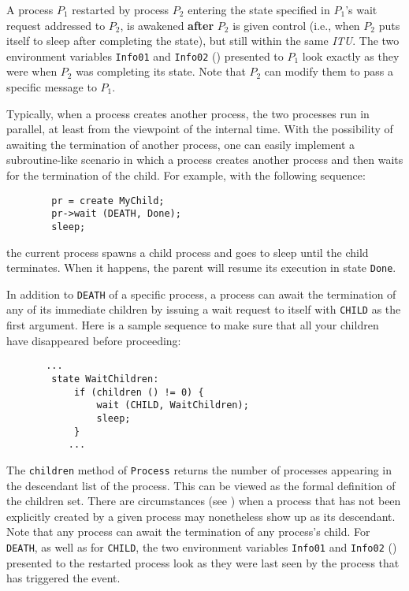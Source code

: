 A process $P_1$ restarted by process $P_2$ entering the state specified in
$P_1$'s wait request addressed to $P_2$, is awakened {\bf after} $P_2$ is
given control (i.e., when $P_2$ puts itself to sleep after completing the
state), but still within the same {\em ITU}.
The two environment variables {\tt Info01} and {\tt Info02} ()
presented to
$P_1$ look exactly as they were when $P_2$ was completing its state.
Note that $P_2$ can modify them to pass a specific message to $P_1$.

Typically, when a process creates another process, the two processes run
in parallel, at least from the viewpoint of the internal time.
With the possibility of awaiting the termination of another process, one
can easily implement a subroutine-like
scenario in which a process creates another process
and then waits for the termination of the child.
For example, with the following sequence:
\begin{verbatim}
        pr = create MyChild;
        pr->wait (DEATH, Done);
        sleep;
\end{verbatim}
the current process spawns a child process and goes to sleep until the
child terminates.
When it happens,
the parent will resume its execution in state {\tt Done}.

In addition to {\tt DEATH} of a specific process, a process can await the
termination of any of its immediate children by issuing a wait request to
itself with {\tt CHILD} as the first argument.
Here is a sample sequence to make sure that all your children have disappeared
before proceeding:
\begin{verbatim}
       ...
        state WaitChildren:
            if (children () != 0) {
                wait (CHILD, WaitChildren);
                sleep;
            }
           ...
\end{verbatim}
The {\tt children} method of {\tt Process} returns the number of
processes appearing in the descendant list of the process.
This can be viewed as the formal definition of the children set.
There are circumstances (see ) when a process
that has not been explicitly created by a given process may nonetheless
show up as its descendant.
Note that any process can await the termination of any process's child.
For {\tt DEATH}, as well as for {\tt CHILD}, the two environment variables
{\tt Info01} and {\tt Info02} () presented to the restarted
process look as they were last seen by the process that has
triggered the event.

\medskip

